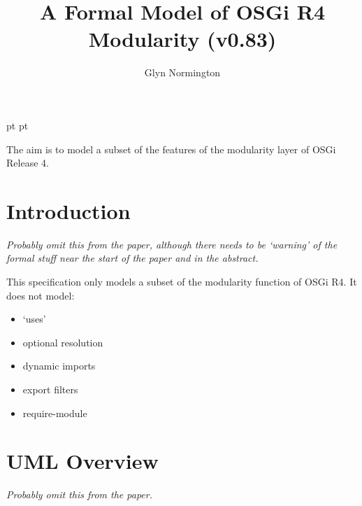 \documentclass[a4paper,9pt]{article}
\begin{document}
 pt
 pt

\title{A Formal Model of OSGi R4 Modularity (v0.83)}
\author{Glyn Normington}
\maketitle
\thispagestyle{myheadings}
\setcounter{page}{0}

The aim is to model a subset of the features of the modularity layer of
OSGi Release 4.


\newcommand{\true}{true}
\newcommand{\false}{false}
\newcommand{\ModuleDefZero}{ModuleDef_0}
\newcommand{\ModuleDefOne}{ModuleDef_1}
\newcommand{\ModuleDefTwo}{ModuleDef_2}
\newcommand{\ModuleDefThree}{ModuleDef_3}
\newcommand{\ModuleDefFour}{ModuleDef_4}

\clearpage
{}
\section{Introduction}
\label{cha:intro}
\textit{Probably omit this from the paper, although there needs to be
`warning' of the formal stuff near the start of the paper and in the
abstract.}

This specification only models a subset of the modularity function of OSGi R4.
It does not model:
\begin{itemize}
\item `uses'
\item optional resolution
\item dynamic imports
\item export filters
\item require-module
\end{itemize}

\clearpage
\section{UML Overview}
\label{cha:uml}
\textit{Probably omit this from the paper.}
\end{document}

